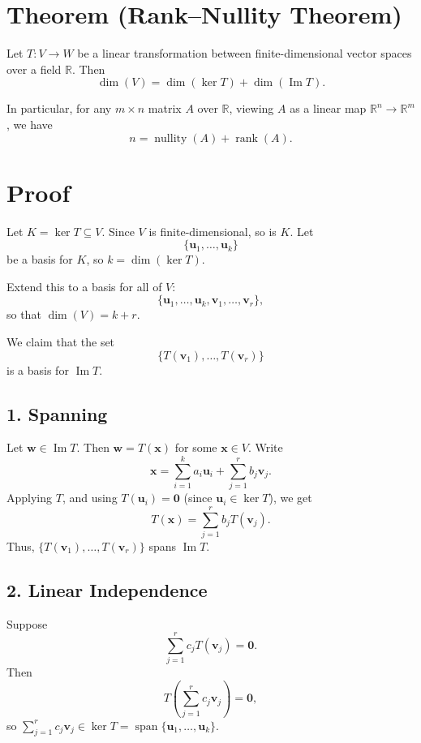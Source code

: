 \documentclass[11pt]{article}
\begin{document}
\section*{Theorem (Rank--Nullity Theorem)}

Let $ T: V \to W $ be a linear transformation between finite-dimensional vector spaces over a field $ \mathbb{R} $. Then
\[
\dim(V) = \dim(\ker T) + \dim(\operatorname{Im} T).
\]

In particular, for any $ m \times n $ matrix $ A $ over $ \mathbb{R} $, viewing $ A $ as a linear map $ \mathbb{R}^n \to \mathbb{R}^m $, we have
\[
n = \operatorname{nullity}(A) + \operatorname{rank}(A).
\]

\section*{Proof}

Let $ K = \ker T \subseteq V $. Since $ V $ is finite-dimensional, so is $ K $. Let
\[
\{ \mathbf{u}_1, \dots, \mathbf{u}_k \}
\]
be a basis for $ K $, so $ k = \dim(\ker T) $.

Extend this to a basis for all of $ V $:
\[
\{ \mathbf{u}_1, \dots, \mathbf{u}_k, \mathbf{v}_1, \dots, \mathbf{v}_r \},
\]
so that $ \dim(V) = k + r $.

We claim that the set
\[
\{ T(\mathbf{v}_1), \dots, T(\mathbf{v}_r) \}
\]
is a basis for $ \operatorname{Im} T $.

\subsection*{1. Spanning}

Let $ \mathbf{w} \in \operatorname{Im} T $. Then $ \mathbf{w} = T(\mathbf{x}) $ for some $ \mathbf{x} \in V $. Write
\[
\mathbf{x} = \sum_{i=1}^k a_i \mathbf{u}_i + \sum_{j=1}^r b_j \mathbf{v}_j.
\]
Applying $ T $, and using $ T(\mathbf{u}_i) = \mathbf{0} $ (since $ \mathbf{u}_i \in \ker T $), we get
\[
T(\mathbf{x}) = \sum_{j=1}^r b_j T(\mathbf{v}_j).
\]
Thus, $ \{ T(\mathbf{v}_1), \dots, T(\mathbf{v}_r) \} $ spans $ \operatorname{Im} T $.

\subsection*{2. Linear Independence}

Suppose
\[
\sum_{j=1}^r c_j T(\mathbf{v}_j) = \mathbf{0}.
\]
Then
\[
T\left( \sum_{j=1}^r c_j \mathbf{v}_j \right) = \mathbf{0},
\]
so $ \sum_{j=1}^r c_j \mathbf{v}_j \in \ker T = \operatorname{span}\{ \mathbf{u}_1, \dots, \mathbf{u}_k \} $.
\end{document}
